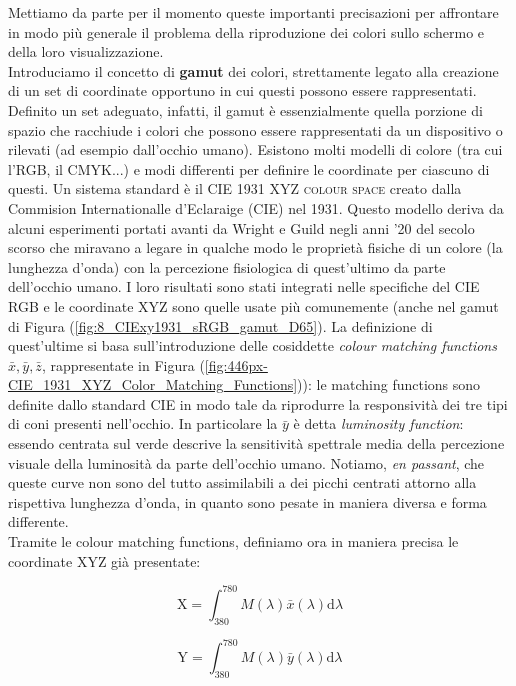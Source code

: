 \documentclass[10pt,letterpaper]{article}
\begin{document}
Mettiamo da parte per il momento queste importanti precisazioni per affrontare in modo più generale il problema della riproduzione dei colori sullo schermo e della loro visualizzazione.\\
Introduciamo il concetto di \textbf{gamut} dei colori, strettamente legato alla creazione di un set di coordinate opportuno in cui questi possono essere rappresentati. Definito un set adeguato, infatti, il gamut è essenzialmente quella porzione di spazio che racchiude i colori che possono essere rappresentati da un dispositivo o rilevati (ad esempio dall'occhio umano). Esistono molti modelli di colore (tra cui l'RGB, il CMYK...) e modi differenti per definire le coordinate per ciascuno di questi. Un sistema standard è il \textsc{CIE 1931 XYZ colour space} creato dalla Commision Internationalle d'Eclaraige (CIE) nel 1931. Questo modello deriva da alcuni esperimenti portati avanti da Wright e Guild  negli anni '20 del secolo scorso che miravano a legare in qualche modo le proprietà fisiche di un colore (la lunghezza d'onda) con la percezione fisiologica di quest'ultimo da parte dell'occhio umano. I loro risultati sono stati integrati nelle specifiche del CIE RGB e le coordinate XYZ sono quelle usate più comunemente (anche nel gamut di Figura (\ref{fig:8_CIExy1931_sRGB_gamut_D65}). La definizione di quest'ultime si basa sull'introduzione delle cosiddette \textit{colour matching functions} $\bar{x}, \bar{y}, \bar{z}$, rappresentate in Figura (\ref{fig:446px-CIE_1931_XYZ_Color_Matching_Functions})): le matching functions sono definite dallo standard CIE in modo tale da riprodurre la responsività dei tre tipi di coni presenti nell'occhio. In particolare la $\bar{y}$ è detta \textit{luminosity function}: essendo centrata sul verde descrive la sensitività spettrale media della percezione visuale della luminosità da parte dell'occhio umano. Notiamo, \textit{en passant}, che queste curve non sono del tutto assimilabili a dei picchi centrati attorno alla rispettiva lunghezza d'onda, in quanto sono pesate in maniera diversa e forma differente.\\
Tramite le colour matching functions, definiamo ora in maniera precisa le coordinate XYZ già presentate:

\begin{equation}
\mathrm{X} = \int_{380}^{780} M(\lambda) \bar{x}(\lambda) \mathrm{d} \lambda
\end{equation}

\begin{equation}
\mathrm{Y} = \int_{380}^{780} M(\lambda) \bar{y}(\lambda) \mathrm{d} \lambda
\end{equation}
\end{document}
